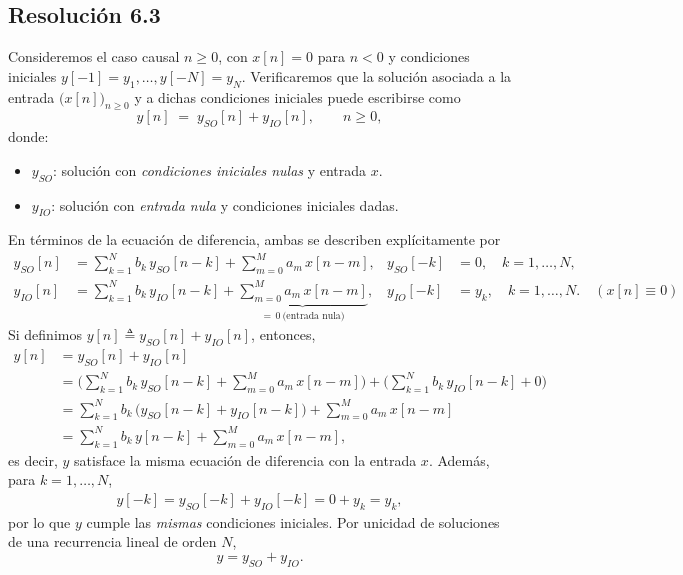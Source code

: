 \documentclass[
  11pt,
  letterpaper,
   addpoints,
   answers
  ]{exam}
\begin{document}
\begin{questions}
\begin{solution}
\subsection*{Resolución 6.3}
Consideremos el caso causal $n\ge 0$, con $x[n]=0$ para $n<0$ y condiciones iniciales
$y[-1]=y_1,\dots,y[-N]=y_N$. Verificaremos que la solución asociada a la entrada $\big(x[n]\big)_{n\ge 0}$ y a dichas condiciones iniciales puede escribirse como
\begin{equation*}
  y[n] \;=\; y_{SO}[n]+y_{IO}[n], \qquad n\ge 0,
\end{equation*}
donde:
\begin{itemize}
  \item $y_{SO}$: solución con \emph{condiciones iniciales nulas} y entrada $x$.
  \item $y_{IO}$: solución con \emph{entrada nula} y condiciones iniciales dadas.
\end{itemize}
En términos de la ecuación de diferencia, ambas se describen explícitamente por
\begin{align}
  y_{SO}[n] &= \sum_{k=1}^{N} b_k\,y_{SO}[n-k] + \sum_{m=0}^{M} a_m\,x[n-m],
  & y_{SO}[-k]&=0,\quad k=1,\dots,N, \\
  y_{IO}[n] &= \sum_{k=1}^{N} b_k\,y_{IO}[n-k]
  + \underbrace{\sum_{m=0}^{M} a_m\,x[n-m]}_{=\,0\ \text{(entrada nula)}},
  & y_{IO}[-k]&=y_k,\quad k=1,\dots,N.\quad (x[n]\equiv 0)
\end{align}
Si definimos $y[n]\triangleq y_{SO}[n]+y_{IO}[n]$, entonces,
\begin{align}
  y[n]
  &= y_{SO}[n]+y_{IO}[n] \\
  &= \Big(\sum_{k=1}^{N} b_k\,y_{SO}[n-k] + \sum_{m=0}^{M} a_m\,x[n-m]\Big)
   + \Big(\sum_{k=1}^{N} b_k\,y_{IO}[n-k] + 0\Big) \\
  &= \sum_{k=1}^{N} b_k\,\big(y_{SO}[n-k]+y_{IO}[n-k]\big)
     + \sum_{m=0}^{M} a_m\,x[n-m] \\
  &= \sum_{k=1}^{N} b_k\,y[n-k] + \sum_{m=0}^{M} a_m\,x[n-m],
\end{align}
es decir, $y$ satisface la misma ecuación de diferencia con la entrada $x$. Además, para $k=1,\dots,N$,
\begin{align}
  y[-k] = y_{SO}[-k]+y_{IO}[-k] = 0 + y_k = y_k,
\end{align}
por lo que $y$ cumple las \emph{mismas} condiciones iniciales. Por unicidad de soluciones de una recurrencia lineal de orden $N$,
\[
  \boxed{\,y = y_{SO}+y_{IO}.\,}
\]


\end{solution}
\end{questions}
\end{document}
